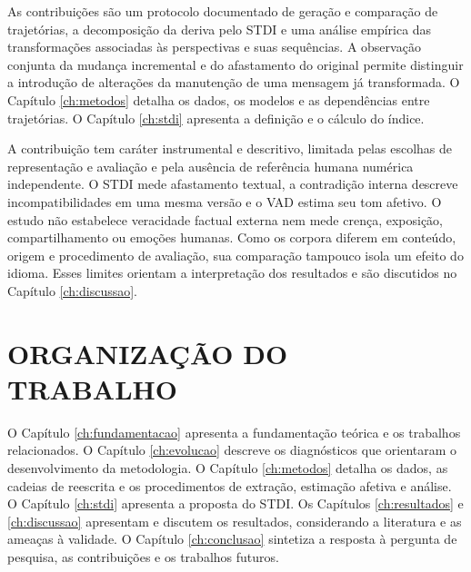 As contribuições são um protocolo documentado de geração e comparação de trajetórias, a decomposição da deriva pelo STDI e uma análise empírica das transformações associadas às perspectivas e suas sequências. A observação conjunta da mudança incremental e do afastamento do original permite distinguir a introdução de alterações da manutenção de uma mensagem já transformada. O Capítulo \ref{ch:metodos} detalha os dados, os modelos e as dependências entre trajetórias. O Capítulo \ref{ch:stdi} apresenta a definição e o cálculo do índice.

A contribuição tem caráter instrumental e descritivo, limitada pelas escolhas de representação e avaliação e pela ausência de referência humana numérica independente. O STDI mede afastamento textual, a contradição interna descreve incompatibilidades em uma mesma versão e o VAD estima seu tom afetivo. O estudo não estabelece veracidade factual externa nem mede crença, exposição, compartilhamento ou emoções humanas. Como os corpora diferem em conteúdo, origem e procedimento de avaliação, sua comparação tampouco isola um efeito do idioma. Esses limites orientam a interpretação dos resultados e são discutidos no Capítulo \ref{ch:discussao}.

\section{ORGANIZAÇÃO DO TRABALHO}
\label{sec:organizacao}

O Capítulo \ref{ch:fundamentacao} apresenta a fundamentação teórica e os trabalhos relacionados. O Capítulo \ref{ch:evolucao} descreve os diagnósticos que orientaram o desenvolvimento da metodologia. O Capítulo \ref{ch:metodos} detalha os dados, as cadeias de reescrita e os procedimentos de extração, estimação afetiva e análise. O Capítulo \ref{ch:stdi} apresenta a proposta do STDI. Os Capítulos \ref{ch:resultados} e \ref{ch:discussao} apresentam e discutem os resultados, considerando a literatura e as ameaças à validade. O Capítulo \ref{ch:conclusao} sintetiza a resposta à pergunta de pesquisa, as contribuições e os trabalhos futuros.
